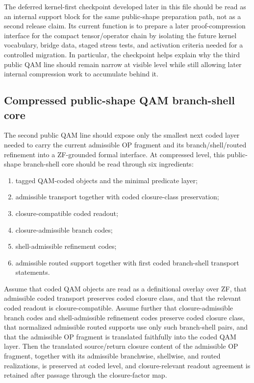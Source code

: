 \begin{remark}\label{rem:qam-roadmap-checkpoint-fit}
The deferred kernel-first checkpoint developed later in this file should be read as an internal support block for the same  public-shape preparation path, not as a second release claim. Its current function is to prepare a later proof-compression interface for the compact tensor/operator chain by isolating the future kernel vocabulary, bridge data, staged stress tests, and activation criteria needed for a controlled migration. In particular, the checkpoint helps explain why the third public QAM line should remain narrow at visible level while still allowing later internal compression work to accumulate behind it.
\end{remark}

\subsection*{Compressed public-shape QAM branch-shell core}
The second public QAM line should expose only the smallest next coded layer needed to carry the current admissible OP fragment and its branch/shell/routed refinement into a ZF-grounded formal interface. At compressed level, this public-shape branch-shell core should be read through six ingredients:
\begin{enumerate}[leftmargin=2em]
 \item tagged QAM-coded objects and the minimal predicate layer;
 \item admissible transport together with coded closure-class preservation;
 \item closure-compatible coded readout;
 \item closure-admissible branch codes;
 \item shell-admissible refinement codes;
 \item admissible routed support together with first coded branch-shell transport statements.
\end{enumerate}

\begin{theorem}
Assume that coded QAM objects are read as a definitional overlay over ZF, that admissible coded transport preserves coded closure class, and that the relevant coded readout is closure-compatible. Assume further that closure-admissible branch codes and shell-admissible refinement codes preserve coded closure class, that normalized admissible routed supports use only such branch-shell pairs, and that the admissible OP fragment is translated faithfully into the coded QAM layer. Then the translated source/return closure content of the admissible OP fragment, together with its admissible branchwise, shellwise, and routed realizations, is preserved at coded level, and closure-relevant readout agreement is retained after passage through the closure-factor map.
\end{theorem}


